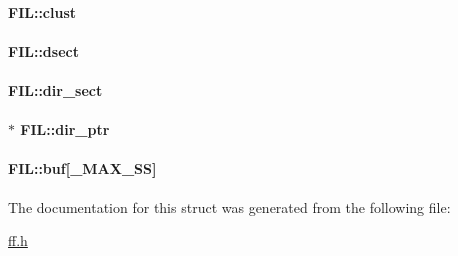 \paragraph[{clust}]{ F\+I\+L\+::clust}\label{struct_f_i_l_aa41312aba551b9a6d1c9d3c8c7d2734b}
\paragraph[{dsect}]{ F\+I\+L\+::dsect}\label{struct_f_i_l_ab3d4165d6fd32ac71a130d835fbf0b4d}
\paragraph[{dir\+\_\+sect}]{ F\+I\+L\+::dir\+\_\+sect}\label{struct_f_i_l_ab203794f939ad4480e81dfa488770783}
\paragraph[{dir\+\_\+ptr}]{$\ast$ F\+I\+L\+::dir\+\_\+ptr}\label{struct_f_i_l_a5af9e9fb312b629220eaf684dd28c4a9}
\paragraph[{buf}]{ F\+I\+L\+::buf\mbox{[}{\bf \+\_\+\+M\+A\+X\+\_\+\+S\+S}\mbox{]}}\label{struct_f_i_l_a7a95fb86588663e48309b5cded7e207b}


The documentation for this struct was generated from the following file\+:\begin{DoxyCompactItemize}
\item 
\hyperlink{ff_8h}{ff.\+h}\end{DoxyCompactItemize}
